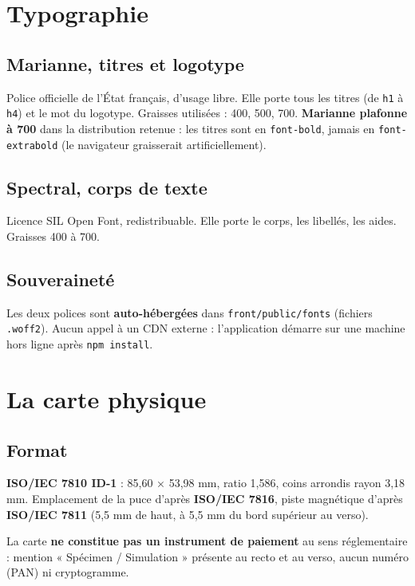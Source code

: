 \documentclass[11pt,a4paper]{article}
\newcommand{\code}[1]{\texttt{\small #1}}
\begin{document}
\section{Typographie}

\subsection{Marianne, titres et logotype}
Police officielle de l'État français, d'usage libre. Elle porte tous les titres
(de \code{h1} à \code{h4}) et le mot du logotype.
Graisses utilisées : 400, 500, 700. \textbf{Marianne plafonne à 700} dans la
distribution retenue : les titres sont en \code{font-bold}, jamais en
\code{font-extrabold} (le navigateur graisserait artificiellement).

\subsection{Spectral, corps de texte}
Licence SIL Open Font, redistribuable. Elle porte le corps, les libellés, les
aides. Graisses 400 à 700.

\subsection{Souveraineté}
Les deux polices sont \textbf{auto-hébergées} dans \code{front/public/fonts}
(fichiers \code{.woff2}). Aucun appel à un CDN externe : l'application démarre
sur une machine hors ligne après \code{npm install}.
\newpage

\section{La carte physique}

\subsection{Format}
\textbf{ISO/IEC 7810 ID-1} : 85,60 × 53,98 mm, ratio 1,586, coins arrondis
rayon 3,18 mm. Emplacement de la puce d'après \textbf{ISO/IEC 7816}, piste
magnétique d'après \textbf{ISO/IEC 7811} (5,5 mm de haut, à 5,5 mm du bord
supérieur au verso).

La carte \textbf{ne constitue pas un instrument de paiement} au sens
réglementaire : mention « Spécimen / Simulation » présente au recto et au
verso, aucun numéro (PAN) ni cryptogramme.
\end{document}
